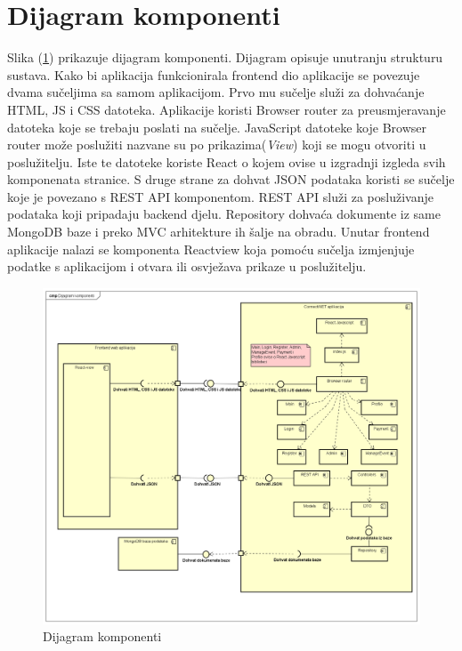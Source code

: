 			\eject
		\section{Dijagram komponenti}
		
		Slika (\ref{fig:DK}) prikazuje dijagram komponenti. Dijagram opisuje unutranju strukturu sustava. Kako bi aplikacija funkcionirala frontend dio aplikacije se povezuje dvama sučeljima sa samom aplikacijom. Prvo mu sučelje služi za dohvaćanje HTML, JS i CSS datoteka. Aplikacije koristi Browser router za preusmjeravanje datoteka koje se trebaju poslati na sučelje. JavaScript datoteke koje Browser router može poslužiti nazvane su po prikazima(\textit{View}) koji se mogu otvoriti u poslužitelju. Iste te datoteke koriste React o kojem ovise u izgradnji izgleda svih komponenata stranice. S druge strane za dohvat JSON podataka koristi se sučelje koje je povezano s REST API komponentom. REST API služi za posluživanje podataka koji pripadaju backend djelu. Repository dohvaća dokumente iz same MongoDB baze i preko MVC arhitekture ih šalje na obradu. Unutar frontend aplikacije nalazi se komponenta Reactview koja pomoću sučelja izmjenjuje podatke s aplikacijom i otvara ili osvježava prikaze u poslužitelju.
						 
			 \begin{figure}[H]
			\includegraphics[width=\textwidth]{slike/Dijagram komponenti.PNG} %
			\caption{Dijagram komponenti}
			\label{fig:DK} %
		\end{figure}